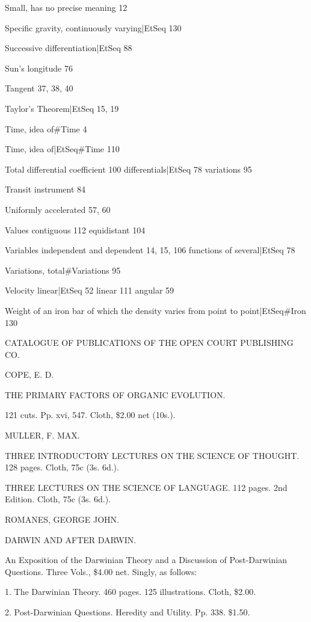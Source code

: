 \documentclass[12pt]{book}[2005/09/16]
\newcommand{\Pagelabel}[1]{\phantomsection\label{page:#1}}
\newcommand{\PageSep}[1]{\Pagelabel{#1}\ignorespaces}
\renewcommand{\(}{{\upshape(}}
\renewcommand{\)}{{\upshape)}}
\begin{document}
Small, has no precise meaning 12

Specific gravity, continuously varying|EtSeq 130 %

Successive differentiation|EtSeq 88 %

Sun's longitude 76

Tangent 37, 38, 40

Taylor's Theorem|EtSeq 15, 19 %

Time, idea of#Time 4

Time, idea of|EtSeq#Time 110 %

Total
  differential coefficient 100
  differentials|EtSeq 78 %
  variations 95

Transit instrument 84

Uniformly accelerated 57, 60

Values
  contiguous 112
  equidistant 104

Variables
  independent and dependent 14, 15, 106
  functions of several|EtSeq 78 %

Variations, total#Variations 95

Velocity
  linear|EtSeq 52 %
  linear 111
  angular 59

Weight of an iron bar of which the density varies from point to point|EtSeq#Iron 130 %
\fi
\PageSep{145}

\iffalse

CATALOGUE OF PUBLICATIONS
OF THE
OPEN COURT PUBLISHING CO.

COPE, E. D.

THE PRIMARY FACTORS OF ORGANIC EVOLUTION.

121 cuts. Pp. xvi, 547. Cloth, \$2.00 net (10s.).


MULLER, F. MAX.

THREE INTRODUCTORY LECTURES ON THE SCIENCE OF
THOUGHT.
128 pages. Cloth, 75c (3s. 6d.).

THREE LECTURES ON THE SCIENCE OF LANGUAGE.
112 pages. 2nd Edition. Cloth, 75c (3s. 6d.).


ROMANES, GEORGE JOHN.

DARWIN AND AFTER DARWIN.

An Exposition of the Darwinian Theory and a Discussion of Post-Darwinian
Questions. Three Vols., \$4.00 net. Singly, as follows:

1. The Darwinian Theory. 460 pages. 125 illustrations. Cloth, \$2.00.

2. Post-Darwinian Questions. Heredity and Utility. Pp. 338. \$1.50.
\end{document}
